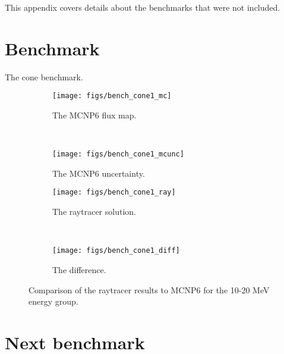 


This appendix covers details about the benchmarks that were not included.

\section{Benchmark}\label{sec:appc_benchmark}

The cone benchmark.

\begin{figure}
    \centering
    \begin{subfigure}[b]{0.45\textwidth}
        \texttt{[image: figs/bench\_cone1\_mc]}
        \caption{The MCNP6 flux map.}
        \label{fig:bench_cone1_mc}
    \end{subfigure}
    ~
    \begin{subfigure}[b]{0.45\textwidth}
        \texttt{[image: figs/bench\_cone1\_mcunc]}
        \caption{The MCNP6 uncertainty.}
        \label{fig:bench_cone1_mcunc}
    \end{subfigure}
    
    \begin{subfigure}[b]{0.45\textwidth}
        \texttt{[image: figs/bench\_cone1\_ray]}
        \caption{The raytracer solution.}
        \label{fig:bench_cone1_ray}
    \end{subfigure}
    ~
    \begin{subfigure}[b]{0.45\textwidth}
        \texttt{[image: figs/bench\_cone1\_diff]}
        \caption{The difference.}
        \label{fig:bench_cone1_diff}
    \end{subfigure}
    \caption{Comparison of the raytracer results to MCNP6 for the 10-20 MeV energy group.}\label{fig:waterHist}
\end{figure}

\section{Next benchmark}



\endinput
